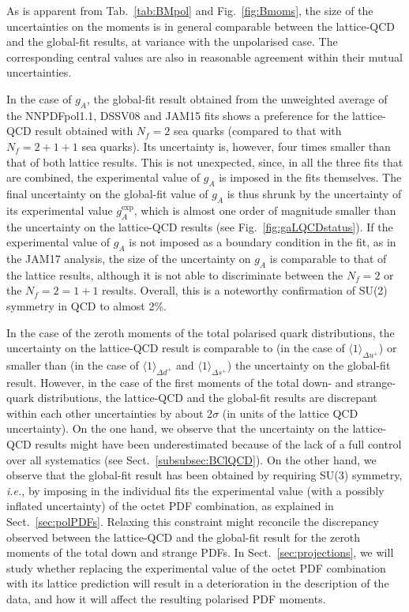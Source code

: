As is apparent from Tab.~\ref{tab:BMpol} and Fig.~\ref{fig:Bmoms}, the size of 
the uncertainties on the moments is in general comparable between the 
lattice-QCD and the global-fit results, at variance with the unpolarised case.
%
The corresponding central values are also in reasonable agreement within their
mutual uncertainties.

In the case of $g_A$, the global-fit result obtained from the unweighted 
average of the NNPDFpol1.1, DSSV08 and JAM15 fits shows a preference for the
lattice-QCD result obtained with $N_f=2$ sea quarks (compared to that with 
$N_f=2+1+1$ sea quarks).
%
Its uncertainty is, however, four times smaller than that of both lattice results.
%
This is not unexpected, since, in all the three fits that are combined, the 
experimental value of $g_A$ is imposed in the fits themselves.
%
The final uncertainty on the global-fit value of $g_A$ is thus shrunk by 
the uncertainty of its experimental value $g_A^\text{exp}$, which is almost
one order of magnitude smaller than the uncertainty on the lattice-QCD results
(see Fig.~\ref{fig:gaLQCDstatus}).
%
If the experimental value of $g_A$ is not imposed as a boundary condition in 
the fit, as in the JAM17 analysis, the size of the uncertainty on $g_A$ is 
comparable to that of the lattice results, although it is not able to 
discriminate between the $N_f=2$ or the $N_f=2=1+1$ results.
%
Overall, this is a noteworthy confirmation of SU(2) symmetry in QCD to
almost 2\%.

In the case of the zeroth moments of the total polarised quark distributions,
the uncertainty on the lattice-QCD result is comparable to (in the case
of $\langle 1 \rangle_{\Delta u^+}$) or smaller than (in the case
of $\langle 1 \rangle_{\Delta d^+}$ and $\langle 1 \rangle_{\Delta s^+}$)
the uncertainty on the global-fit result.
%
However, in the case of the first moments of the total down- and strange-quark 
distributions, the lattice-QCD and the global-fit results are discrepant
within each other uncertainties by about 2$\sigma$ (in units of the
lattice QCD uncertainty).
%
On the one hand, we observe that the uncertainty on the lattice-QCD results 
might have been underestimated because of the lack of a full control over
all systematics (see Sect.~\ref{subsubsec:BClQCD}).
%
On the other hand, we observe that the global-fit result has been obtained
by requiring SU(3) symmetry, {\it i.e.}, by imposing in the individual fits 
the experimental value (with a possibly inflated uncertainty) of the octet PDF 
combination, as explained in Sect.~\ref{sec:polPDFs}.
%
Relaxing this constraint might reconcile the discrepancy observed between 
the lattice-QCD and the global-fit result for the zeroth moments of the 
total down and strange PDFs.
%
In Sect.~\ref{sec:projections}, we will study whether replacing the experimental
value of the octet PDF combination with its lattice prediction
will result in a deterioration in the description of the data, and how it will
affect the resulting polarised PDF moments.
 
